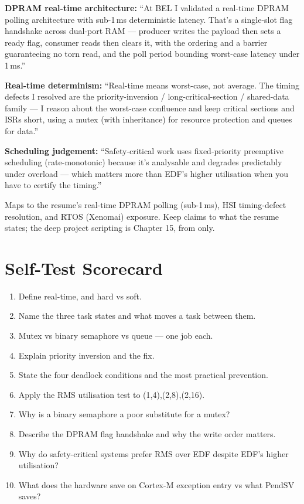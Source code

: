 \begin{resumelink}
\textbf{DPRAM real-time architecture:} ``At BEL I validated a real-time DPRAM
polling architecture with sub-1\,ms deterministic latency. That's a single-slot
flag handshake across dual-port RAM --- producer writes the payload then sets a
ready flag, consumer reads then clears it, with the ordering and a barrier
guaranteeing no torn read, and the poll period bounding worst-case latency under
1\,ms.''

\medskip
\textbf{Real-time determinism:} ``Real-time means worst-case, not average. The
timing defects I resolved are the priority-inversion / long-critical-section /
shared-data family --- I reason about the worst-case confluence and keep
critical sections and ISRs short, using a mutex (with inheritance) for resource
protection and queues for data.''

\medskip
\textbf{Scheduling judgement:} ``Safety-critical work uses fixed-priority
preemptive scheduling (rate-monotonic) because it's analysable and degrades
predictably under overload --- which matters more than EDF's higher utilisation
when you have to certify the timing.''

\medskip
\small Maps to the resume's real-time DPRAM polling (sub-1\,ms), HSI
timing-defect resolution, and RTOS (Xenomai) exposure. Keep claims to what the
resume states; the deep project scripting is Chapter 15, from
 only.
\end{resumelink}

\section{Self-Test Scorecard}

\begin{scorecard}
\begin{enumerate}
\item Define real-time, and hard vs soft.
\item Name the three task states and what moves a task between them.
\item Mutex vs binary semaphore vs queue --- one job each.
\item Explain priority inversion and the fix.
\item State the four deadlock conditions and the most practical prevention.
\item Apply the RMS utilisation test to (1,4),(2,8),(2,16).
\item Why is a binary semaphore a poor substitute for a mutex?
\item Describe the DPRAM flag handshake and why the write order matters.
\item Why do safety-critical systems prefer RMS over EDF despite EDF's higher
  utilisation?
\item What does the hardware save on Cortex-M exception entry vs what PendSV
  saves?
\end{enumerate}
\end{scorecard}

